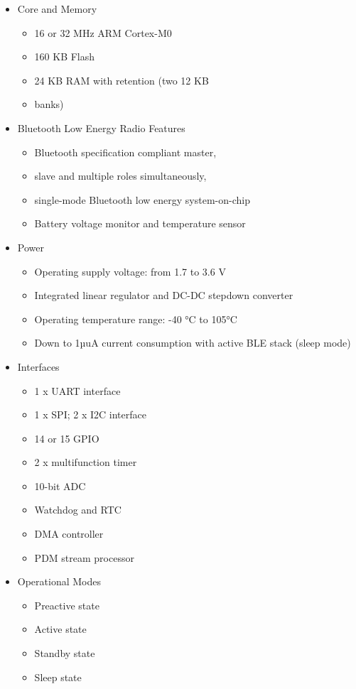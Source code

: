 \documentclass[journal,compsoc]{IEEEtran}
\begin{document}
\begin{itemize}
  \item Core and Memory
    \begin{itemize}
      \item 16 or 32 MHz ARM Cortex-M0
      \item 160 KB Flash
      \item 24 KB RAM with retention (two 12 KB
        \item banks)
    \end{itemize}
  \item Bluetooth Low Energy Radio Features
    \begin{itemize}
      \item Bluetooth specification compliant master,
      \item slave and multiple roles simultaneously,
      \item single-mode Bluetooth low energy system-on-chip
      \item Battery voltage monitor and temperature sensor
    \end{itemize}
  \item Power
    \begin{itemize}
      \item Operating supply voltage: from 1.7 to 3.6 V
      \item Integrated linear regulator and DC-DC stepdown converter
      \item Operating temperature range: -40 °C to 105°C
      \item Down to 1µuA current consumption with active BLE stack (sleep mode)
    \end{itemize}
  \item Interfaces
    \begin{itemize}
      \item 1 x UART interface
      \item 1 x SPI; 2 x I2C interface
      \item 14 or 15 GPIO
      \item 2 x multifunction timer
      \item 10-bit ADC
      \item Watchdog and RTC
      \item DMA controller
      \item PDM stream processor
    \end{itemize}
  \item Operational Modes
  	\begin{itemize}
  	\item Preactive state
   	\item Active state
    \item Standby state
    \item Sleep state
  	\end{itemize}
\end{itemize}
\end{document}
